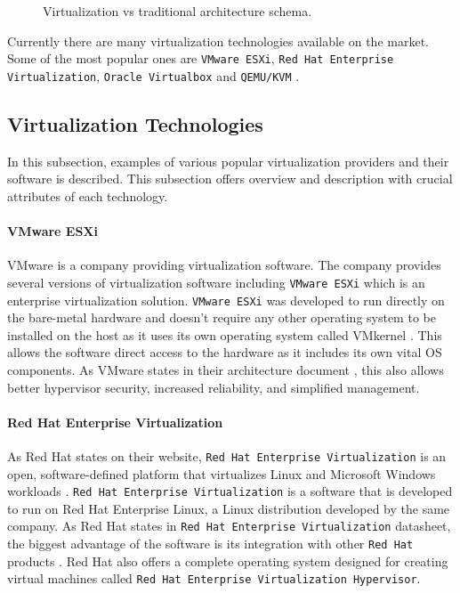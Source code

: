 \begin{figure}[H]
	\centering
	\caption{Virtualization vs traditional architecture schema.}
	\label{fig:virtschema}
\end{figure}

Currently there are many virtualization technologies available on the market. Some of the most popular ones are \texttt{VMware ESXi}, \texttt{Red Hat Enterprise Virtualization}, \texttt{Oracle Virtualbox} and \texttt{QEMU/KVM} \cite{virtualizationpopular}.\\
\subsection{Virtualization Technologies}
In this subsection, examples of various popular virtualization providers and their software is described. This subsection offers overview and description with crucial attributes of each technology.
\paragraph{VMware ESXi}
VMware is a company providing virtualization software. The company provides several versions of virtualization software including \texttt{VMware ESXi} which is an enterprise virtualization solution. \texttt{VMware ESXi} was developed to run directly on the bare-metal hardware and doesn't require any other operating system to be installed on the host as it uses its own operating system called VMkernel \cite{vmwarearch}. This allows the software direct access to the hardware as it includes its own vital OS components. As VMware states in their architecture document \cite{vmwarearch}, this also allows better hypervisor security, increased reliability,
and simplified management. 
\paragraph{Red Hat Enterprise Virtualization}
As Red Hat states on their website, \texttt{Red Hat Enterprise Virtualization} is an open, software-defined platform that virtualizes Linux and Microsoft Windows workloads \cite{rhev}. \texttt{Red Hat Enterprise Virtualization} is a software that is developed to run on Red Hat Enterprise Linux, a Linux distribution developed by the same company. As Red Hat states in \texttt{Red Hat Enterprise Virtualization} datasheet, the biggest advantage of the software is its integration with other \texttt{Red Hat} products \cite{rhdatasheet}. Red Hat also offers a complete operating system designed for creating virtual machines called \texttt{Red Hat Enterprise Virtualization Hypervisor}.
